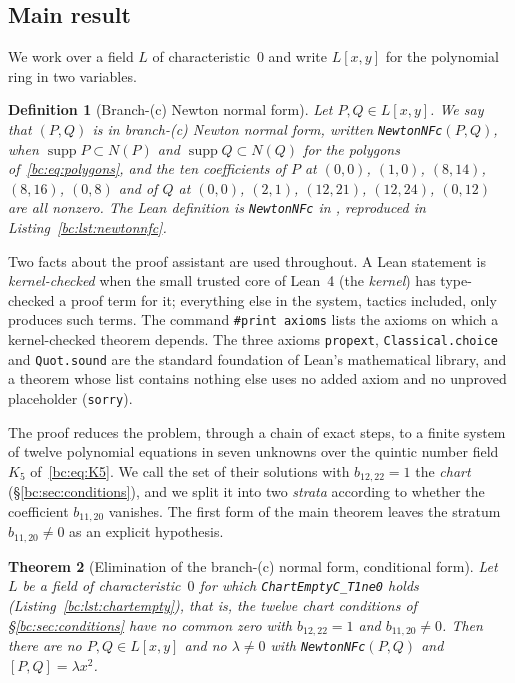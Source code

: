 \documentclass[a4paper,11pt]{article}
\newcommand{\filename}[1]{\texttt{\seqsplit{#1}}}
\theoremstyle{jsplain}
\newtheorem{theorem}{Theorem}[section]
\theoremstyle{jsdef}
\newtheorem{definition}[theorem]{Definition}
\theoremstyle{jsrem}
\begin{document}
\subsection{Main result}

We work over a field $L$ of characteristic~$0$ and write $L[x,y]$ for the polynomial ring in two variables.

\begin{definition}[Branch-(c) Newton normal form]\label{bc:def:newtonnfc}
Let $P,Q\in L[x,y]$. We say that $(P,Q)$ is in \emph{branch-(c) Newton normal form}, written \texttt{NewtonNFc}$(P,Q)$, when $\operatorname{supp}P\subset N(P)$ and $\operatorname{supp}Q\subset N(Q)$ for the polygons of~\eqref{bc:eq:polygons}, and the ten coefficients of $P$ at $(0,0)$, $(1,0)$, $(8,14)$, $(8,16)$, $(0,8)$ and of $Q$ at $(0,0)$, $(2,1)$, $(12,21)$, $(12,24)$, $(0,12)$ are all nonzero. The Lean definition is \texttt{NewtonNFc} in \filename{Jacobian/BranchC/DescentClaim.lean}, reproduced in Listing~\ref{bc:lst:newtonnfc}.
\end{definition}

Two facts about the proof assistant are used throughout. A Lean statement is \emph{kernel-checked} when the small trusted core of Lean~4 (the \emph{kernel}) has type-checked a proof term for it; everything else in the system, tactics included, only produces such terms. The command \texttt{\#print axioms} lists the axioms on which a kernel-checked theorem depends. The three axioms \texttt{propext}, \texttt{Classical.\allowbreak{}choice} and \texttt{Quot.\allowbreak{}sound} are the standard foundation of Lean's mathematical library, and a theorem whose list contains nothing else uses no added axiom and no unproved placeholder (\texttt{sorry}).

The proof reduces the problem, through a chain of exact steps, to a finite system of twelve polynomial equations in seven unknowns over the quintic number field $K_5$ of~\eqref{bc:eq:K5}. We call the set of their solutions with $b_{12,22}=1$ the \emph{chart} (\S\ref{bc:sec:conditions}), and we split it into two \emph{strata} according to whether the coefficient $b_{11,20}$ vanishes. The first form of the main theorem leaves the stratum $b_{11,20}\neq0$ as an explicit hypothesis.

\begin{theorem}[Elimination of the branch-(c) normal form, conditional form]\label{bc:thm:main}
Let $L$ be a field of characteristic~$0$ for which \texttt{ChartEmptyC\_\allowbreak{}T1ne0} holds (Listing~\ref{bc:lst:chartempty}), that is, the twelve chart conditions of \S\ref{bc:sec:conditions} have no common zero with $b_{12,22}=1$ and $b_{11,20}\neq0$. Then there are no $P,Q\in L[x,y]$ and no $\lambda\neq0$ with \texttt{NewtonNFc}$(P,Q)$ and $[P,Q]=\lambda x^2$.
\end{theorem}
\end{document}
